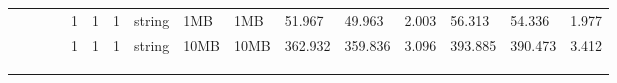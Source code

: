 \begin{landscape}
\begin{table}[]
{\begin{tabular}{@{}ccccllllllllllll@{}}
                                                &                              &                               &                                                 & 1                                        & 1                                          & 1                                 & string                           & 1MB                                           & 1MB                                             & 51.967                  & 49.963   & 2.003                        & 56.313                  & 54.336   & 1.977                        \\
                                                &                              &                               &                                                 & 1                                        & 1                                          & 1                                 & string                           & 10MB                                          & 10MB                                            & 362.932                 & 359.836  & 3.096                        & 393.885                 & 390.473  & 3.412                        \\
    \multicolumn{1}{l}{}                        & \multicolumn{1}{l}{}         & \multicolumn{1}{l}{}          & \multicolumn{1}{l}{}                            &                                          &                                            &                                   &                                  &                                               &                                                 &                         &          &                              &                         &          &                              \\
    \multicolumn{1}{l}{}                        & \multicolumn{1}{l}{}         & \multicolumn{1}{l}{}          & \multicolumn{1}{l}{}                            &                                          &                                            &                                   &                                  &                                               &                                                 &                         &          &                              &                         &          &                              \\
    \multicolumn{1}{l}{}                        & \multicolumn{1}{l}{}         & \multicolumn{1}{l}{}          & \multicolumn{1}{l}{}                            &                                          &                                            &                                   &                                  &                                               &                                                 &                         &          &                              &                         &          &                              \\

\end{tabular}}
\end{table}
\end{landscape}

